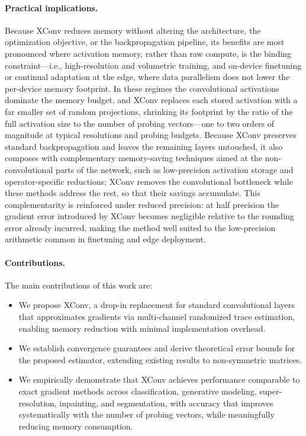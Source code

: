 \documentclass[10pt]{article}
\begin{document}
\paragraph{Practical implications.} Because XConv reduces memory without altering the architecture, the optimization objective, or the backpropagation pipeline, its benefits are most pronounced where activation memory, rather than raw compute, is the binding constraint---i.e., high-resolution and volumetric training, and on-device finetuning or continual adaptation at the edge, where data parallelism does not lower the per-device memory footprint. In these regimes the convolutional activations dominate the memory budget, and XConv replaces each stored activation with a far smaller set of random projections, shrinking its footprint by the ratio of the full activation size to the number of probing vectors---one to two orders of magnitude at typical resolutions and probing budgets. Because XConv preserves standard backpropagation and leaves the remaining layers untouched, it also composes with complementary memory-saving techniques aimed at the non-convolutional parts of the network, such as low-precision activation storage and operator-specific reductions; XConv removes the convolutional bottleneck while these methods address the rest, so that their savings accumulate. This complementarity is reinforced under reduced precision: at half precision the gradient error introduced by XConv becomes negligible relative to the rounding error already incurred, making the method well suited to the low-precision arithmetic common in finetuning and edge deployment.

\paragraph{Contributions.} The main contributions of this work are:

\begin{itemize}
    \item We propose XConv, a drop-in replacement for standard convolutional layers that approximates gradients via multi-channel randomized trace estimation, enabling memory reduction with minimal implementation overhead.

    \item We establish convergence guarantees and derive theoretical error bounds for the proposed estimator, extending existing results to non-symmetric matrices.

    \item We empirically demonstrate that XConv achieves performance comparable to exact gradient methods across classification, generative modeling, super-resolution, inpainting, and segmentation, with accuracy that improves systematically with the number of probing vectors, while meaningfully reducing memory consumption.

\end{itemize}
\end{document}
